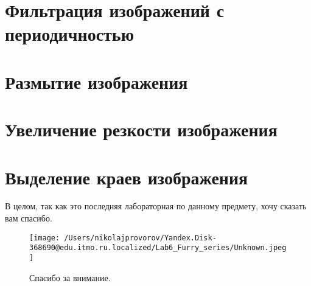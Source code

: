 \section{Фильтрация изображений с периодичностью}



\clearpage

\section{Размытие изображения}



\clearpage

\section{Увеличение резкости изображения}



\clearpage

\section{Выделение краев изображения}



\clearpage

В целом, так как это последняя лабораторная по данному предмету, хочу сказать вам спасибо. 

\begin{figure}[ht!]
    \centering
    \texttt{[image: /Users/nikolajprovorov/Yandex.Disk-368690@edu.itmo.ru.localized/Lab6\_Furry\_series/Unknown.jpeg]}
    \caption{Спасибо за внимание.}
\end{figure}